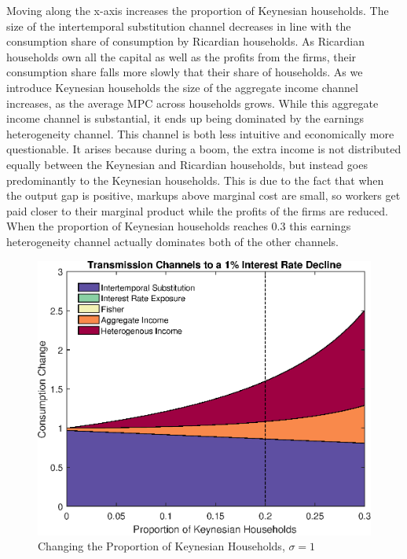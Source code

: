 \documentclass[titlepage]{\econtex}\newcommand{\texname}{ConsumptionHeterogeneity}
\begin{document}
Moving along the x-axis increases the proportion of Keynesian households. The size of the intertemporal substitution channel decreases in line with the consumption share of consumption by Ricardian households. As Ricardian households own all the capital as well as the profits from the firms, their consumption share falls more slowly that their share of households. As we introduce Keynesian households the size of the aggregate income channel increases, as the average MPC across households grows. While this aggregate income channel is substantial, it ends up being dominated by the earnings heterogeneity channel. This channel is both less intuitive and economically more questionable. It arises because during a boom, the extra income is not distributed equally between the Keynesian and Ricardian households, but instead goes predominantly to the Keynesian households. This is due to the fact that when the output gap is positive, markups above marginal cost are small, so workers get paid closer to their marginal product while the profits of the firms are reduced. When the proportion of Keynesian households reaches 0.3 this earnings heterogeneity channel actually dominates both of the other channels.

\begin{figure} 
	\begin{centering}
		\includegraphics[scale=0.7]{../Matlab/DynareCode/Figures/ProportionKeynesian_sigma1.eps}
		\caption{Changing the Proportion of Keynesian Households, $\sigma=1$}
		\label{fig:ProportionKeynesian}
	\end{centering}
\end{figure}
\end{document}
